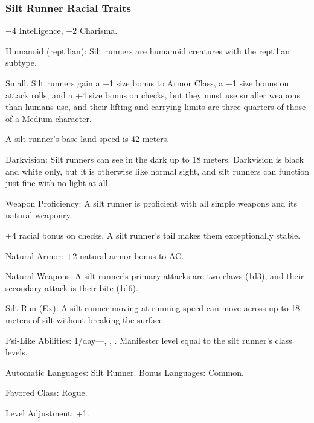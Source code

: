 \subsubsection{Silt Runner Racial Traits}
\begin{itemize*}
    \item $-4$ Intelligence, $-2$ Charisma.
    \item Humanoid (reptilian): Silt runners are humanoid creatures with the reptilian subtype.
    \item Small. Silt runners gain a +1 size bonus to Armor Class, a +1 size bonus on attack rolls, and a +4 size bonus on  checks, but they must use smaller weapons than humans use, and their lifting and carrying limits are three-quarters of those of a Medium character.
    \item A silt runner's base land speed is 42 meters.
    \item Darkvision: Silt runners can see in the dark up to 18 meters. Darkvision is black and white only, but it is otherwise like normal sight, and silt runners can function just fine with no light at all.
    \item Weapon Proficiency: A silt runner is proficient with all simple weapons and its natural weaponry.
    \item +4 racial bonus on  checks. A silt runner's tail makes them exceptionally stable.
    \item Natural Armor: +2 natural armor bonus to AC.
    \item Natural Weapons: A silt runner's primary attacks are two claws (1d3), and their secondary attack is their bite (1d6).
    \item Silt Run (Ex): A silt runner moving at running speed can move across up to 18 meters of silt without breaking the surface.
    \item Psi-Like Abilities: 1/day---, , . Manifester level equal to the silt runner's class levels.
    \item Automatic Languages: Silt Runner. Bonus Languages: Common.
    \item Favored Class: Rogue.
    \item Level Adjustment: +1.
\end{itemize*}

